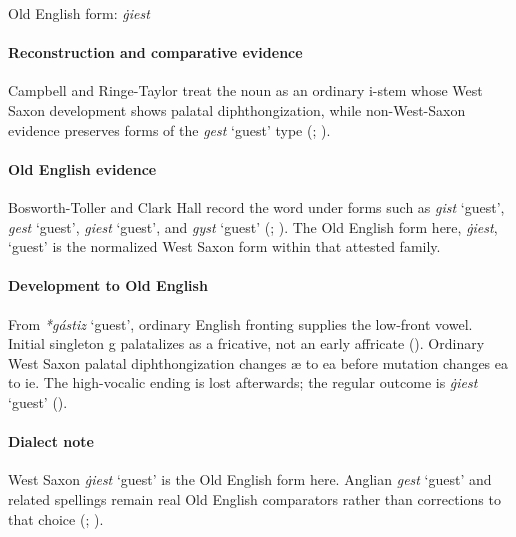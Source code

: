 \documentclass[
  british,
  a4paper,
]{article}
\providecommand{\Recon}[1]{\emph{*#1}}
\begin{document}
Old English form: \emph{ġiest}

\paragraph{Reconstruction and comparative
evidence}\label{reconstruction-and-comparative-evidence-31}

Campbell and Ringe-Taylor treat the noun as an ordinary i-stem whose
West Saxon development shows palatal diphthongization, while
non-West-Saxon evidence preserves forms of the \emph{gest} `guest' type
(;
).

\paragraph{Old English evidence}\label{old-english-evidence-31}

Bosworth-Toller and Clark Hall record the word under forms such as
\emph{gist} `guest', \emph{gest} `guest', \emph{giest} `guest', and
\emph{gyst} `guest' (; ). The Old
English form here, \emph{ġiest}, `guest' is the normalized West Saxon
form within that attested family.

\paragraph{Development to Old
English}\label{development-to-old-english-31}

From \Recon{gástiz} `guest', ordinary English fronting supplies the
low-front vowel. Initial singleton g palatalizes as a fricative, not an
early affricate (). Ordinary
West Saxon palatal diphthongization changes æ to ea before mutation
changes ea to ie. The high-vocalic ending is lost afterwards; the
regular outcome is \emph{ġiest} `guest'
().

\paragraph{Dialect note}\label{dialect-note-1}

West Saxon \emph{ġiest} `guest' is the Old English form here. Anglian
\emph{gest} `guest' and related spellings remain real Old English
comparators rather than corrections to that choice
(;
).
\end{document}
